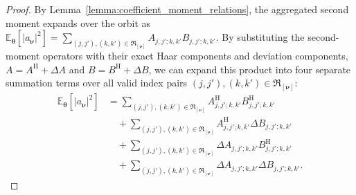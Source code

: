 \documentclass[%
 reprint,
 amsmath,amssymb,
 aps,
 pra,
]{revtex4-2}
\theoremstyle{definition}
\begin{document}
\begin{proof}
By Lemma~\ref{lemma:coefficient_moment_relations}, the aggregated second moment expands over the orbit as $\mathbb{E}_{\bm{\theta}} \left[ |a_{\bm{\nu}}|^2 \right] = \sum_{(j,j'), (k,k') \in \mathfrak{R}_{[\bm{\nu}]}} A_{j,j';k,k'} B_{j,j';k,k'}$. By substituting the second-moment operators with their exact Haar components and deviation components, $A = A^{\mathrm{H}} + \Delta A$ and $B = B^{\mathrm{H}} + \Delta B$, we can expand this product into four separate summation terms over all valid index pairs $(j,j'), (k,k') \in \mathfrak{R}_{[\bm{\nu}]}$:
\begin{align}
\label{eq:four_terms_expansion}
\mathbb{E}_{\bm{\theta}} \left[ |a_{\bm{\nu}}|^2 \right]
&= \sum_{(j,j'), (k,k') \in \mathfrak{R}_{[\bm{\nu}]}} A^{\mathrm{H}}_{j,j';k,k'} B^{\mathrm{H}}_{j,j';k,k'} \nonumber \\
&\quad + \sum_{(j,j'), (k,k') \in \mathfrak{R}_{[\bm{\nu}]}} A^{\mathrm{H}}_{j,j';k,k'} \Delta B_{j,j';k,k'} \nonumber \\
&\quad + \sum_{(j,j'), (k,k') \in \mathfrak{R}_{[\bm{\nu}]}} \Delta A_{j,j';k,k'} B^{\mathrm{H}}_{j,j';k,k'} \nonumber \\
&\quad + \sum_{(j,j'), (k,k') \in \mathfrak{R}_{[\bm{\nu}]}} \Delta A_{j,j';k,k'} \Delta B_{j,j';k,k'}.
\end{align}


\end{proof}
\end{document}
